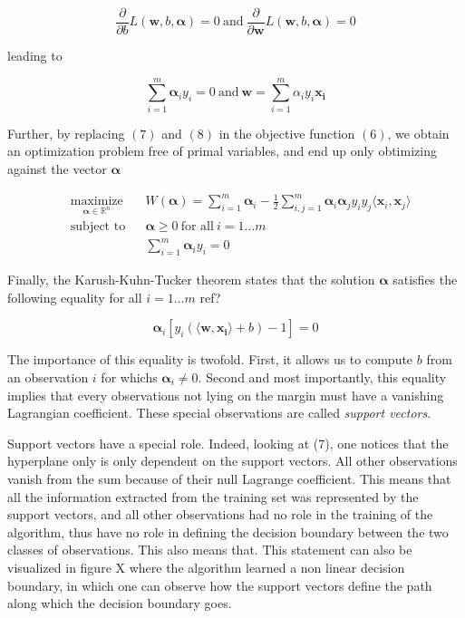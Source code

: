 \begin{equation}
  \frac{\partial}{\partial b}L(\mathbf{w}, b, \boldsymbol{\alpha}) = 0
  \ \text{and}\ 
  \frac{\partial}{\partial \mathbf{w}}L(\mathbf{w}, b, \boldsymbol{\alpha}) = 0
\end{equation}

leading to

\begin{equation}
  \sum^m_{i=1} \boldsymbol{\alpha}_iy_i = 0
  \ \text{and}\ 
  \mathbf{w} = \sum^m_{i=1} \alpha_iy_i\mathbf{x_i}
\end{equation}

Further, by replacing $(7)$ and $(8)$ in the objective function $(6)$, we obtain an optimization problem free of primal variables, and end up only obtimizing against the vector $\boldsymbol{\alpha}$

\begin{equation}
  \begin{aligned}
    &\underset{\boldsymbol{\alpha} \in \mathbb{R}^n} {\text{maximize}}
    & & W(\boldsymbol{\alpha}) = \sum_{i=1}^m\boldsymbol{\alpha}_i - \frac{1}{2}\sum_{i,j=1}^m\boldsymbol{\alpha}_i\boldsymbol{\alpha}_jy_iy_j\langle\mathbf{x}_i, \mathbf{x}_j\rangle\\
    &\text{subject to}
    & &\boldsymbol{\alpha} \ge 0\ \text{for all}\ i = 1 \dotsc m\\
    & & &\sum^m_{i=1} \boldsymbol{\alpha}_iy_i = 0
  \end{aligned}
\end{equation}

Finally, the Karush-Kuhn-Tucker theorem states that the solution $\boldsymbol{\alpha}$ satisfies the following equality for all $i = 1\dotsc m$
\textcolor[rgb]{1,0,0}{ref?}

\begin{equation}
  \boldsymbol{\alpha}_i[y_i(\langle \mathbf{w}, \mathbf{x_i}\rangle + b) - 1] = 0
\end{equation}

The importance of this equality is twofold. First, it allows us to compute $b$ from an observation $i$ for whichs $\boldsymbol{\alpha}_i \neq 0$. Second and most importantly, this equality implies that every observations not lying on the margin must have a vanishing Lagrangian coefficient. These special observations are called \textit{support vectors}.

Support vectors have a special role. Indeed, looking at (7), one notices that the hyperplane only is only dependent on the support vectors. All other observations vanish from the sum because of their null Lagrange coefficient. This means that all the information extracted from the training set was represented by the support vectors, and all other observations had no role in the training of the algorithm, thus have no role in defining the decision boundary between the two classes of observations. This also means that. This statement can also be visualized in figure X where the algorithm learned a non linear decision boundary, in which one can observe how the support vectors define the path along which the decision boundary goes.

